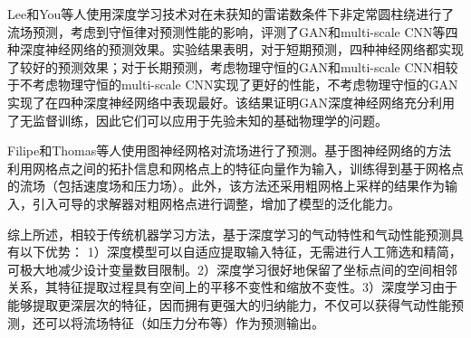 Lee和You等人\cite{lee2019data}使用深度学习技术对在未获知的雷诺数条件下非定常圆柱绕进行了流场预测，考虑到守恒律对预测性能的影响，评测了GAN和multi-scale CNN等四种深度神经网络的预测效果。实验结果表明，对于短期预测，四种神经网络都实现了较好的预测效果；对于长期预测，考虑物理守恒的GAN和multi-scale CNN相较于不考虑物理守恒的multi-scale CNN实现了更好的性能，不考虑物理守恒的GAN实现了在四种深度神经网络中表现最好。该结果证明GAN深度神经网络充分利用了无监督训练，因此它们可以应用于先验未知的基础物理学的问题。

Filipe和Thomas等人\cite{2020Combining}使用图神经网格对流场进行了预测。基于图神经网络的方法利用网格点之间的拓扑信息和网格点上的特征向量作为输入，训练得到基于网格点的流场（包括速度场和压力场）。此外，该方法还采用粗网格上采样的结果作为输入，引入可导的求解器对粗网格点进行调整，增加了模型的泛化能力。

综上所述，相较于传统机器学习方法，基于深度学习的气动特性和气动性能预测具有以下优势：
1）深度模型可以自适应提取输入特征，无需进行人工筛选和精简，可极大地减少设计变量数目限制。2）深度学习很好地保留了坐标点间的空间相邻关系，其特征提取过程具有空间上的平移不变性和缩放不变性。3）深度学习由于能够提取更深层次的特征，因而拥有更强大的归纳能力，不仅可以获得气动性能预测，还可以将流场特征（如压力分布等）作为预测输出。

